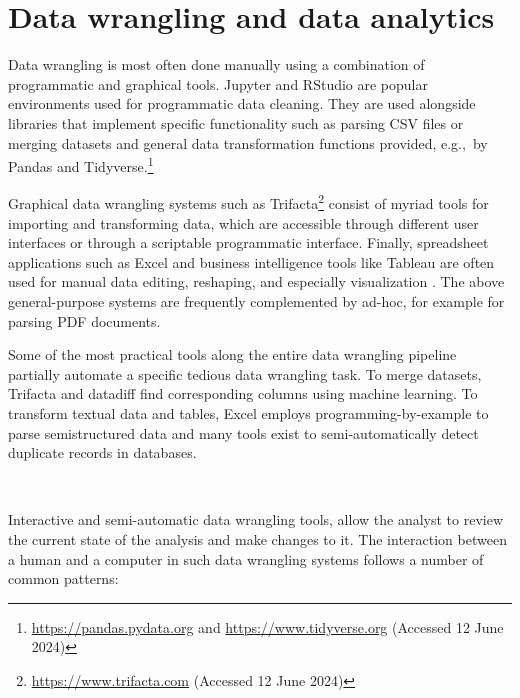 \documentclass[fleqn,11pt]{report}
\theoremstyle{definition}
\begin{document}
\section{Data wrangling and data analytics}

Data wrangling is most often done manually using a combination of programmatic and graphical tools.
Jupyter and RStudio are popular environments used for programmatic data cleaning.
They are used alongside libraries that implement specific functionality such as parsing CSV files
or merging datasets \cite{gerrit-2019-csv,sutton-2018-datadiff} and general data transformation
functions provided, e.g.,~by Pandas and Tidyverse.\footnote{\url{https://pandas.pydata.org} and
\url{https://www.tidyverse.org} (Accessed 12 June 2024)}

Graphical data wrangling systems such as Trifacta\footnote{\url{https://www.trifacta.com} (Accessed
12 June 2024)} consist of myriad tools for importing and transforming data, which are accessible
through different user interfaces or through a scriptable programmatic interface.
Finally, spreadsheet applications such as Excel and business intelligence tools like Tableau are
often used for manual data editing, reshaping, and especially
visualization \citep{kandel-2011-research}. The above general-purpose systems are frequently
complemented by ad-hoc, for example for parsing PDF documents.

Some of the most practical tools along the entire data wrangling pipeline partially automate
a specific tedious data wrangling task. To merge datasets, Trifacta and datadiff
\citep{sutton-2018-datadiff} find corresponding columns using machine learning. To transform textual
data and tables, Excel employs programming-by-example to parse semistructured
data and many tools exist to semi-automatically detect duplicate records in databases.

~

Interactive and semi-automatic data wrangling tools, allow the analyst to review
the current state of the analysis and make changes to it. The interaction
between a human and a computer in such data wrangling systems follows a number of common patterns:
\end{document}
